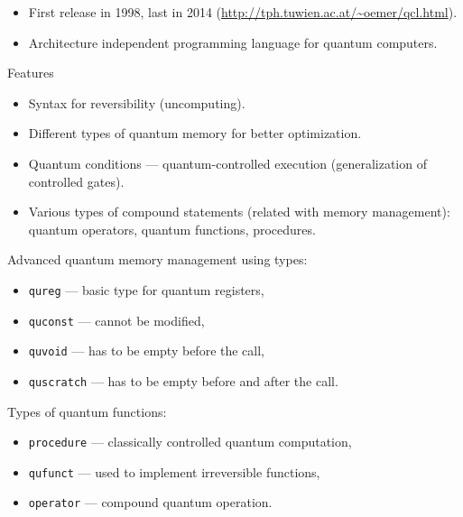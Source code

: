 \documentclass[a4paper,11pt]{article}
\begin{document}
\begin{itemize}
\item First release in 1998, last in 2014 
(\url{http://tph.tuwien.ac.at/~oemer/qcl.html}).
\item Architecture independent programming language for quantum 
computers.

\end{itemize}




Features
\begin{itemize}
\item Syntax for reversibility (uncomputing).
\item Different types of quantum memory for better optimization.
\item Quantum conditions --- quantum-controlled execution 
(generalization of controlled 
gates).
\item Various types of compound statements (related with memory 
management): quantum operators, quantum functions, procedures.

\end{itemize}



Advanced quantum memory management using types:
\begin{itemize}
\item \texttt{qureg} ---  basic type for quantum registers,
\item \texttt{quconst} --- cannot be modified,
\item \texttt{quvoid} --- has to be empty before the call,
\item \texttt{quscratch} --- has to be empty before and after the 
call.
\end{itemize}

Types of quantum functions:
\begin{itemize}
\item \texttt{procedure} ---  classically controlled quantum 
computation,
\item \texttt{qufunct} --- used to implement irreversible functions,
\item \texttt{operator} --- compound quantum operation.
\end{itemize}


\end{document}
